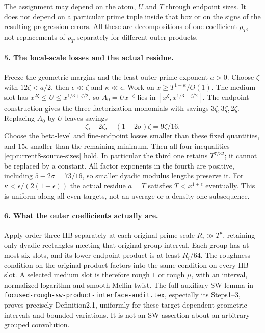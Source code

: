 The assignment may depend on the atom, $U$ and $T$ through endpoint
sizes. It does not depend on a particular prime tuple inside that
box or on the signs of the resulting progression errors. All these
are decompositions of one coefficient $\rho_T$, not replacements
of $\rho_T$ separately for different outer products.

\paragraph{5. The local-scale losses and the actual residue.}
Freeze the geometric margins and the least outer prime exponent
$a>0$. Choose $\zeta$ with $12\zeta<a/2$, then
$\epsilon\ll\zeta$ and $\kappa\ll\epsilon$. Work on
$x\ge T^{1-\kappa}/O(1)$. The medium slot has
$x^{2\zeta}\le U\le x^{1/3+\zeta/2}$, so
$A_0=Ux^{-\zeta}$ lies in
$[x^\zeta,x^{1/3-\zeta/2}]$. The endpoint construction gives the
three factorization monomials with savings $3\zeta,3\zeta,2\zeta$.
Replacing $A_0$ by $U$ leaves savings
\[
 \zeta,\quad 2\zeta,\quad(1-2\sigma)\zeta=9\zeta/16.
\]
Choose the beta-level and fine-endpoint losses smaller than these
fixed quantities, and $15\epsilon$ smaller than the remaining
minimum. Then all four inequalities
\eqref{eq:current8-source-sizes} hold. In particular the third
one retains $T^{7/32}$; it cannot be replaced by a constant.
All factor exponents in the fourth are positive, including
$5-2\sigma=73/16$, so smaller dyadic modulus lengths preserve it.
For $\kappa<\epsilon/(2(1+\epsilon))$ the actual residue $a=T$
satisfies $T<x^{1+\epsilon}$ eventually. This is uniform along
all even targets, not an average or a density-one subsequence.

\paragraph{6. What the outer coefficients actually are.}
Apply order-three HB separately at each original prime scale
$R_i\gg T^a$, retaining only dyadic rectangles meeting that
original group interval. Each group has at most six slots, and
its lower-endpoint product is at least $R_i/64$. The roughness
condition on the original product factors into the same condition
on every HB slot. A selected medium slot is therefore rough
$1$ or rough $\mu$, with an interval, normalized logarithm and
smooth Mellin twist. The full auxiliary SW lemma in
\texttt{focused-rough-sw-product-interface-audit.tex}, especially
its Steps1--3, proves precisely Definition2.1, uniformly for these
target-dependent geometric intervals and bounded variations.
It is not an SW assertion about an arbitrary grouped convolution.

